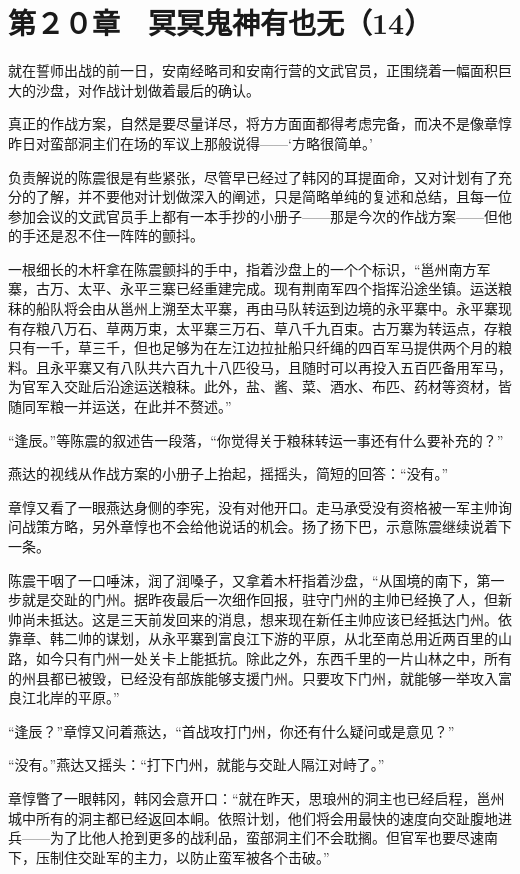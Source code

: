 \section{第２０章　冥冥鬼神有也无（14）}

就在誓师出战的前一日，安南经略司和安南行营的文武官员，正围绕着一幅面积巨大的沙盘，对作战计划做着最后的确认。

真正的作战方案，自然是要尽量详尽，将方方面面都得考虑完备，而决不是像章惇昨日对蛮部洞主们在场的军议上那般说得——‘方略很简单。’

负责解说的陈震很是有些紧张，尽管早已经过了韩冈的耳提面命，又对计划有了充分的了解，并不要他对计划做深入的阐述，只是简略单纯的复述和总结，且每一位参加会议的文武官员手上都有一本手抄的小册子——那是今次的作战方案——但他的手还是忍不住一阵阵的颤抖。

一根细长的木杆拿在陈震颤抖的手中，指着沙盘上的一个个标识，“邕州南方军寨，古万、太平、永平三寨已经重建完成。现有荆南军四个指挥沿途坐镇。运送粮秣的船队将会由从邕州上溯至太平寨，再由马队转运到边境的永平寨中。永平寨现有存粮八万石、草两万束，太平寨三万石、草八千九百束。古万寨为转运点，存粮只有一千，草三千，但也足够为在左江边拉扯船只纤绳的四百军马提供两个月的粮料。且永平寨又有八队共六百九十八匹役马，且随时可以再投入五百匹备用军马，为官军入交趾后沿途运送粮秣。此外，盐、酱、菜、酒水、布匹、药材等资材，皆随同军粮一并运送，在此并不赘述。”

“逢辰。”等陈震的叙述告一段落，“你觉得关于粮秣转运一事还有什么要补充的？”

燕达的视线从作战方案的小册子上抬起，摇摇头，简短的回答：“没有。”

章惇又看了一眼燕达身侧的李宪，没有对他开口。走马承受没有资格被一军主帅询问战策方略，另外章惇也不会给他说话的机会。扬了扬下巴，示意陈震继续说着下一条。

陈震干咽了一口唾沫，润了润嗓子，又拿着木杆指着沙盘，“从国境的南下，第一步就是交趾的门州。据昨夜最后一次细作回报，驻守门州的主帅已经换了人，但新帅尚未抵达。这是三天前发回来的消息，想来现在新任主帅应该已经抵达门州。依靠章、韩二帅的谋划，从永平寨到富良江下游的平原，从北至南总用近两百里的山路，如今只有门州一处关卡上能抵抗。除此之外，东西千里的一片山林之中，所有的州县都已被毁，已经没有部族能够支援门州。只要攻下门州，就能够一举攻入富良江北岸的平原。”

“逢辰？”章惇又问着燕达，“首战攻打门州，你还有什么疑问或是意见？”

“没有。”燕达又摇头：“打下门州，就能与交趾人隔江对峙了。”

章惇瞥了一眼韩冈，韩冈会意开口：“就在昨天，思琅州的洞主也已经启程，邕州城中所有的洞主都已经返回本峒。依照计划，他们将会用最快的速度向交趾腹地进兵——为了比他人抢到更多的战利品，蛮部洞主们不会耽搁。但官军也要尽速南下，压制住交趾军的主力，以防止蛮军被各个击破。”

